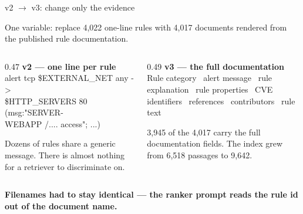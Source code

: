 \documentclass[aspectratio=169,11pt]{beamer}
\newcommand{\lede}[1]{{\color{soft}\small #1\par\medskip}}
\newcommand{\keytake}[1]{%
  \vfill
  \noindent\colorbox{accenttint}{%
    \begin{minipage}{\dimexpr\textwidth-2\fboxsep-2\fboxrule\relax}
      \vspace{2pt}
      \small\color{accent}\textbf{#1}
      \vspace{2pt}
    \end{minipage}}\par}
\begin{document}
\begin{frame}{v2 $\rightarrow$ v3: change only the evidence}
  \lede{One variable: replace 4,022 one-line rules with 4,017 documents rendered from the published rule documentation.}
  \begin{columns}[T,onlytextwidth]
    \begin{column}{0.47\textwidth}
      \textbf{\color{accent}v2 --- one line per rule}\\[0.4em]
      {\footnotesize\ttfamily alert tcp \$EXTERNAL\_NET any -> \\ \$HTTP\_SERVERS 80 (msg:"SERVER-\\WEBAPP /.... access"; ...)}
      \vspace{0.7em}

      {\small Dozens of rules share a generic message. There is almost nothing for a retriever to discriminate on.}
    \end{column}
    \begin{column}{0.49\textwidth}
      \textbf{\color{accent}v3 --- the full documentation}\\[0.4em]
      {\small Rule category \textbullet\ alert message \textbullet\ rule
      explanation \textbullet\ rule properties \textbullet\ CVE identifiers \textbullet\
      references \textbullet\ contributors \textbullet\ rule text}
      \vspace{0.7em}

      {\small 3,945 of the 4,017 carry the full documentation fields. The index grew from 6,518 passages to 9,642.}
    \end{column}
  \end{columns}
  \keytake{Filenames had to stay identical --- the ranker prompt reads the rule id out of the document name.}
\end{frame}
\end{document}
